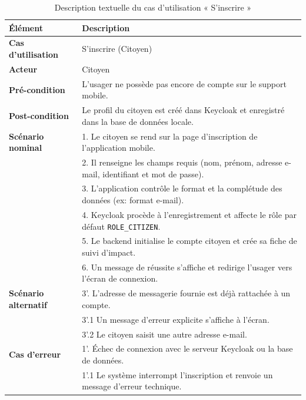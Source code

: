 \begin{table}[H]
    \centering
    \caption{Description textuelle du cas d'utilisation « S'inscrire »}
    \label{tab:txt_inscription}
    \vspace{0.2cm}
    \small
    \begin{tabularx}{\textwidth}{|l|X|}
        \hline
        \textbf{Élément} & \textbf{Description} \\ \hline
        \textbf{Cas d’utilisation} & S'inscrire (Citoyen) \\ \hline
        \textbf{Acteur} & Citoyen \\ \hline
        \textbf{Pré-condition} & L'usager ne possède pas encore de compte sur le support mobile. \\ \hline
        \textbf{Post-condition} & Le profil du citoyen est créé dans Keycloak et enregistré dans la base de données locale. \\ \hline
        \textbf{Scénario nominal} &
        1. Le citoyen se rend sur la page d'inscription de l'application mobile.\\
        & 2. Il renseigne les champs requis (nom, prénom, adresse e-mail, identifiant et mot de passe).\\
        & 3. L'application contrôle le format et la complétude des données (ex: format e-mail).\\
        & 4. Keycloak procède à l'enregistrement et affecte le rôle par défaut \texttt{ROLE\_CITIZEN}.\\
        & 5. Le backend initialise le compte citoyen et crée sa fiche de suivi d'impact.\\
        & 6. Un message de réussite s'affiche et redirige l'usager vers l'écran de connexion. \\ \hline
        \textbf{Scénario alternatif} &
        3'. L'adresse de messagerie fournie est déjà rattachée à un compte.\\
        & 3'.1 Un message d'erreur explicite s'affiche à l'écran.\\
        & 3'.2 Le citoyen saisit une autre adresse e-mail. \\ \hline
        \textbf{Cas d’erreur} &
        1'. Échec de connexion avec le serveur Keycloak ou la base de données.\\
        & 1'.1 Le système interrompt l'inscription et renvoie un message d'erreur technique. \\ \hline
    \end{tabularx}
\end{table}

